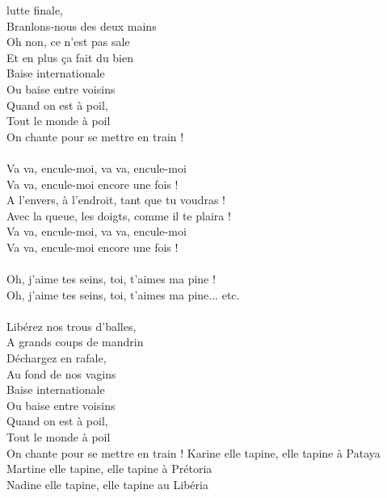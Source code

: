 
 lutte finale,
\\Branlons-nous des deux mains
\\Oh non, ce n'est pas sale
\\Et en plus ça fait du bien
\\Baise internationale
\\Ou baise entre voisins
\\Quand on est à poil,
\\Tout le monde à poil
\\On chante pour se mettre en train !
\\\\Va va, encule-moi, va va, encule-moi
\\Va va, encule-moi encore une fois ! \bissimplemple
\\A l'envers, à l'endroit, tant que tu voudras !
\\Avec la queue, les doigts, comme il te plaira !
\\Va va, encule-moi, va va, encule-moi
\\Va va, encule-moi encore une fois !
\\\\Oh, j'aime tes seins, toi, t'aimes ma pine !
\\Oh, j'aime tes seins, toi, t'aimes ma pine... etc.
\\\\Libérez nos trous d'balles,
\\A grands coups de mandrin
\\Déchargez en rafale,
\\Au fond de nos vagins
\\Baise internationale
\\Ou baise entre voisins
\\Quand on est à poil,
\\Tout le monde à poil
\\On chante pour se mettre en train !
\breakpage
Karine elle tapine, elle tapine à Pataya
\\Martine elle tapine, elle tapine à Prétoria
\\Nadine elle tapine, elle tapine au Libéria
